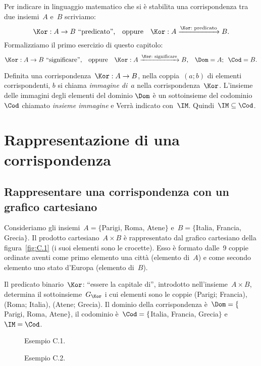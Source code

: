 Per indicare in linguaggio matematico che si è stabilita una corrispondenza tra due insiemi~$A$ e~$B$ scriviamo:
\[\Kor:A \rightarrow B\text{ ``predicato'',} \quad \text{oppure} \quad \Kor:A \xrightarrow{\Kor:\text{ predicato}} B.\]
Formalizziamo il primo esercizio di questo capitolo:
\[\Kor:A \rightarrow B \textrm{ ``significare'',}\quad \text{oppure} \quad \Kor:A \xrightarrow{\Kor:\text{ significare}} B\text{,}\quad \Dom = A \text{;~~} \Cod = B.\]

\begin{definizione}
Definita una corrispondenza~$\Kor:A \rightarrow B$, nella coppia~$(a;b)$ di elementi corrispondenti, $b$ si chiama \emph{immagine di}~$a$ nella corrispondenza~$\Kor$.
L'insieme delle immagini degli elementi del dominio $\Dom$ è un sottoinsieme del codominio $\Cod$ chiamato \emph{insieme immagine} e Verrà indicato con~$\IM$. Quindi~$\IM \subseteq\Cod$.
\end{definizione}

\section{Rappresentazione di una corrispondenza}
\subsection{Rappresentare una corrispondenza con un grafico cartesiano}
\begin{exrig}
\begin{esempio}\label{ex:C.1}
Consideriamo gli insiemi~$A= \{$Parigi, Roma, Atene$\}$ e~$B= \{$Italia, Francia, Grecia$\}$. Il prodotto cartesiano~$A \times B$ è rappresentato dal grafico cartesiano della
figura~\ref{fig:C.1} (i suoi elementi sono le crocette).
Esso è formato dalle~9 coppie ordinate aventi come primo elemento una città (elemento di~$A$) e come secondo elemento uno stato d'Europa (elemento di~$B$).

Il predicato binario~$\Kor$: ``essere la capitale di'', introdotto nell'insieme~$A \times B$, determina il sottoinsieme~$G_\Kor$ i cui elementi sono le coppie (Parigi; Francia),
(Roma; Italia), (Atene; Grecia). Il dominio della corrispondenza è~$\Dom= \{$Parigi, Roma, Atene$\}$, il codominio è~$\Cod= \{$Italia, Francia, Grecia$\}$ e~$\IM=\Cod$.
\end{esempio}
\end{exrig}

\begin{figure}[b]
\begin{minipage}[t]{.3\textwidth}
 \centering
 
 \caption{Esempio C.1.}\label{fig:C.1}
\end{minipage}\hfil
\begin{minipage}[t]{.65\textwidth}
 \centering
 
 \caption{Esempio C.2.}\label{fig:C.2}
\end{minipage}
\end{figure}
\ovalbox{\risolvii \ref{ese:C.1}, \ref{ese:C.2}}

